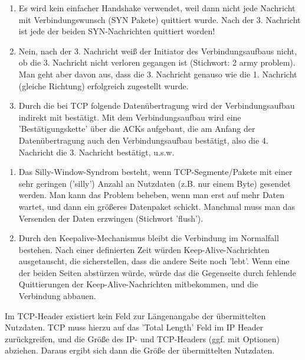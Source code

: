 
\begin{enumerate}
    \item Es wird kein einfacher Handshake verwendet, weil dann nicht jede Nachricht mit Verbindungswunsch (SYN Pakete) quittiert wurde.
    Nach der 3. Nachricht ist jede der beiden SYN-Nachrichten quittiert worden!
    \item Nein, nach der 3. Nachricht weiß der Initiator des Verbindungsaufbaus nicht, ob die 3. Nachricht nicht verloren gegangen ist (Stichwort: 2 army problem).
    Man geht aber davon aus, dass die 3. Nachricht genauso wie die 1. Nachricht (gleiche Richtung) erfolgreich zugestellt wurde.
    \item Durch die bei TCP folgende Datenübertragung wird der Verbindungsaufbau indirekt mit bestätigt.
    Mit dem Verbindungsaufbau wird eine 'Bestätigungskette' über die ACKs aufgebaut, die am Anfang der Datenübertragung auch den Verbindungsaufbau bestätigt, also die 4. Nachricht die 3. Nachricht bestätigt, u.s.w.
\end{enumerate}

\begin{enumerate}
    \item Das Silly-Window-Syndrom besteht, wenn TCP-Segmente/Pakete mit einer sehr geringen ('silly') Anzahl an Nutzdaten (z.B. nur einem Byte) gesendet werden.
    Man kann das Problem beheben, wenn man erst auf mehr Daten wartet, und dann ein größeres Datenpaket schickt.
    Manchmal muss man das Versenden der Daten erzwingen (Stichwort 'flush').
    \item Durch den Keepalive-Mechanismus bleibt die Verbindung im Normalfall bestehen.
    Nach einer definierten Zeit würden Keep-Alive-Nachrichten ausgetauscht, die sicherstellen, dass die andere Seite noch 'lebt'.
    Wenn eine der beiden Seiten abstürzen würde, würde das die Gegenseite durch fehlende Quittierungen der Keep-Alive-Nachrichten mitbekommen, und die Verbindung abbauen.
\end{enumerate}

Im TCP-Header existiert kein Feld zur Längenangabe der übermittelten Nutzdaten.
TCP muss hierzu auf das 'Total Length' Feld im IP Header zurückgreifen, und die Größe des IP- und TCP-Headers (ggf. mit Optionen) abziehen.
Daraus ergibt sich dann die Größe der übermittelten Nutzdaten.

